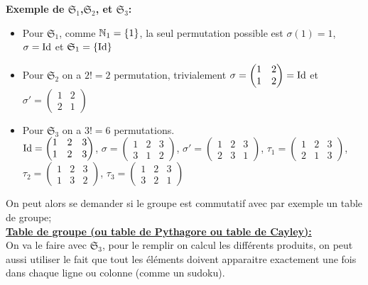 \textbf{Exemple de $\mathfrak{S}_1$,$\mathfrak{S}_2$, et $\mathfrak{S}_3$:}
\begin{itemize}
	\item Pour $\mathfrak{S}_1$, comme $\mathbb{N}_1=\{1\}$, la seul permutation possible est $\sigma(1)=1$, $\sigma=\operatorname{Id}$ et $\mathfrak{S}_1=\{\operatorname{Id}\}$\\
	\item Pour $\mathfrak{S}_2$ on a $2!=2$ permutation, trivialement $\sigma=\begin{pmatrix}
		1 & 2  \\
		1 & 2  
	\end{pmatrix}=\operatorname{Id}$ et $\sigma'=\begin{pmatrix}
	1 & 2  \\
	2 & 1 
\end{pmatrix}$\\
\item Pour $\mathfrak{S}_3$ on a $3!=6$ permutations.\\

$\operatorname{Id}=\begin{pmatrix}
	1 & 2 & 3  \\
	1 & 2 & 3 
\end{pmatrix}$, $\sigma=\begin{pmatrix}
1 & 2 & 3  \\
3 & 1 & 2 
\end{pmatrix}$, $\sigma'=\begin{pmatrix}
1 & 2 & 3  \\
2 & 3 & 1 
\end{pmatrix}$, $\tau_1=\begin{pmatrix}
1 & 2 & 3  \\
2 & 1 & 3 
\end{pmatrix}$, $\tau_2=\begin{pmatrix}
1 & 2 & 3  \\
1 & 3 & 2 
\end{pmatrix}$, $\tau_3=\begin{pmatrix}
1 & 2 & 3  \\
3 & 2 & 1
\end{pmatrix}$
\end{itemize}
On peut alors se demander si le groupe est commutatif avec par exemple un table de groupe;\\
\textbf{\underline{Table de groupe (ou table de Pythagore ou table de Cayley):}\\}
On va le faire avec $\mathfrak{S}_3$, pour le remplir on calcul les différents produits, on peut aussi utiliser le fait que tout les éléments doivent apparaitre exactement une fois dans chaque ligne ou colonne (comme un sudoku)\cite{S}.\\
